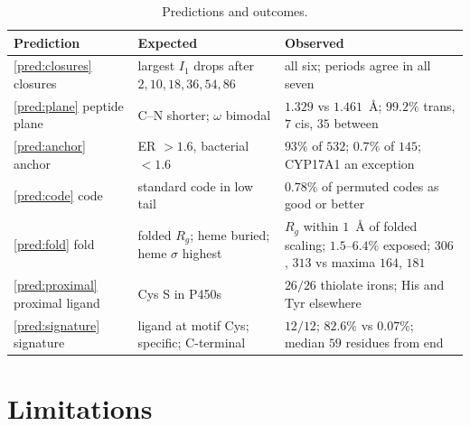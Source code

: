 \documentclass[10pt,twocolumn,a4paper]{article}
\newcommand{\sep}{\sigma}
\begin{document}
\begin{table}[t]
\centering
\small
\caption{Predictions and outcomes.}
\label{tab:outcomes}
\begin{tabular}{@{}p{3.6cm}p{4.6cm}p{5.4cm}@{}}
\toprule
Prediction & Expected & Observed\\
\midrule
\ref{pred:closures} closures & largest $I_1$ drops after $2,10,18,36,54,86$ &
all six; periods agree in all seven\\
\ref{pred:plane} peptide plane & C--N shorter; $\omega$ bimodal &
$1.329$ vs $1.461$~\AA; $99.2\%$ trans, $7$ cis, $35$ between\\
\ref{pred:anchor} anchor & ER $>1.6$, bacterial $<1.6$ & $93\%$ of $532$;
$0.7\%$ of $145$; CYP17A1 an exception\\
\ref{pred:code} code & standard code in low tail & $0.78\%$ of permuted codes
as good or better\\
\ref{pred:fold} fold & folded $R_g$; heme buried; heme $\sep$ highest &
$R_g$ within $1$~\AA{} of folded scaling; $1.5$--$6.4\%$ exposed; $306$, $313$
vs maxima $164$, $181$\\
\ref{pred:proximal} proximal ligand & Cys S in P450s & $26/26$ thiolate
irons; His and Tyr elsewhere\\
\ref{pred:signature} signature & ligand at motif Cys; specific; C-terminal &
$12/12$; $82.6\%$ vs $0.07\%$; median $59$ residues from end\\
\bottomrule
\end{tabular}
\end{table}

\section{Limitations}
\label{sec:limits}
\end{document}
